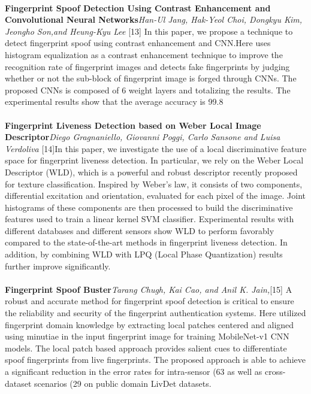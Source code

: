 \documentclass[a4paper,12pt,oneside]{article}
\begin{document}
\paragraph{}
\textbf{Fingerprint Spoof Detection Using Contrast
Enhancement and Convolutional
Neural Networks}\textit{Han-Ul Jang, Hak-Yeol Choi, Dongkyu Kim, Jeongho Son,and Heung-Kyu Lee }[13] In this paper, we propose a technique to detect fingerprint spoof using contrast enhancement and CNN.Here uses histogram equalization as a contrast enhancement technique to improve the recognition rate of fingerprint images and detects fake fingerprints by judging whether or not the sub-block of fingerprint image is forged through CNNs. The proposed CNNs is composed of 6 weight layers and totalizing the results. The experimental results show that the average accuracy is 99.8%


\paragraph{}
\textbf{Fingerprint Liveness Detection
based on Weber Local Image Descriptor}\textit{Diego Gragnaniello, Giovanni Poggi, Carlo Sansone and Luisa Verdoliva} [14]In this paper, we investigate the use of a local discriminative feature space for fingerprint liveness detection. In particular, we rely on the Weber Local Descriptor (WLD),
which is a powerful and robust descriptor recently proposed for texture classification. Inspired by Weber’s law, it consists of two components, differential excitation and orientation, evaluated for each pixel of the image. Joint histograms of these components are then processed to build the discriminative features used to train a linear kernel SVM classifier. Experimental results with different databases and different sensors show WLD to perform favorably compared to the state-of-the-art methods in fingerprint liveness detection. In addition, by combining WLD with LPQ (Local Phase
Quantization) results further improve significantly.

\paragraph{}
\textbf{Fingerprint Spoof Buster}\textit{Tarang Chugh, Kai Cao, and Anil K. Jain,}[15] A robust and accurate method for fingerprint spoof detection
is critical to ensure the reliability and security of the fingerprint
authentication systems. Here utilized
fingerprint domain knowledge by extracting local patches
centered and aligned using minutiae in the input fingerprint
image for training MobileNet-v1 CNN models. The local patch
based approach provides salient cues to differentiate spoof
fingerprints from live fingerprints. The proposed approach is
able to achieve a significant reduction in the error rates for
intra-sensor (63%
as well as cross-dataset scenarios (29%
on public domain LivDet datasets.
\end{document}
